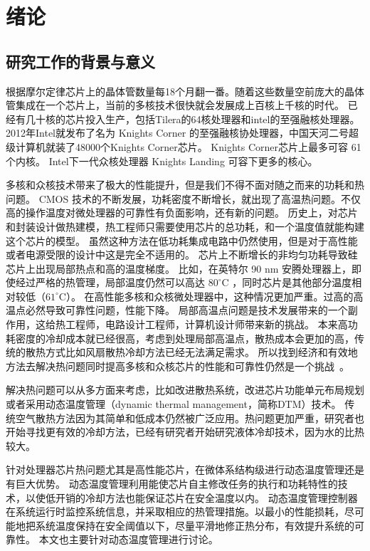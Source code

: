 
\chapter{绪论}
\section{研究工作的背景与意义}\label{sec:mean}
根据摩尔定律芯片上的晶体管数量每18个月翻一番。随着这些数量空前庞大的晶体管集成在一个芯片上，当前的多核技术很快就会发展成上百核上千核的时代。
已经有几十核的芯片投入生产，包括Tilera的64核处理器和intel的至强融核处理器。2012年Intel就发布了名为 Knights Corner 的至强融核协处理器，中国天河二号超级计算机就装了48000个Knights Corner芯片。
Knights Corner芯片上最多可容 61个内核。
Intel下一代众核处理器 Knights Landing 可容下更多的核心。


多核和众核技术带来了极大的性能提升，但是我们不得不面对随之而来的功耗和热问题。
CMOS 技术的不断发展，功耗密度不断增长，就出现了高温热问题。不仅高的操作温度对微处理器的可靠性有负面影响，还有新的问题。
历史上，对芯片和封装设计做热建模，热工程师只需要使用芯片的总功耗，和一个温度值就能构建这个芯片的模型。
虽然这种方法在低功耗集成电路中仍然使用，但是对于高性能或者电源受限的设计中这是完全不适用的。
芯片上不断增长的非均匀功耗导致硅芯片上出现局部热点和高的温度梯度。
比如，在英特尔 90 nm 安腾处理器上，即使经过严格的热管理，局部温度仍然可以高达 $80 ^\circ$C ，同时芯片是其他部分温度相对较低（$61^\circ$C）。
在高性能多核和众核微处理器中，这种情况更加严重。过高的高温点必然导致可靠性问题，性能下降。
局部高温点问题是技术发展带来的一个副作用，这给热工程师，电路设计工程师，计算机设计师带来新的挑战。
本来高功耗密度的冷却成本就已经很高，考虑到处理局部高温点，散热成本会更加的高，传统的散热方式比如风扇散热冷却方法已经无法满足需求。
所以找到经济和有效地方法去解决热问题同时提高多核和众核芯片的性能和可靠性仍然是一个挑战~。


解决热问题可以从多方面来考虑，比如改进散热系统，改进芯片功能单元布局规划或者采用动态温度管理（dynamic thermal management，简称DTM）技术。
传统空气散热方法因为其简单和低成本仍然被广泛应用。热问题更加严重，研究者也开始寻找更有效的冷却方法，已经有研究者开始研究液体冷却技术，因为水的比热较大。

针对处理器芯片热问题尤其是高性能芯片，在微体系结构级进行动态温度管理还是有巨大优势。
动态温度管理利用能使芯片自主修改任务的执行和功耗特性的技术，以使低开销的冷却方法也能保证芯片在安全温度以内。
动态温度管理控制器在系统运行时监控系统信息，并采取相应的热管理措施。以最小的性能损耗，尽可能地把系统温度保持在安全阈值以下，尽量平滑地修正热分布，有效提升系统的可靠性。
本文也主要针对动态温度管理进行讨论。




